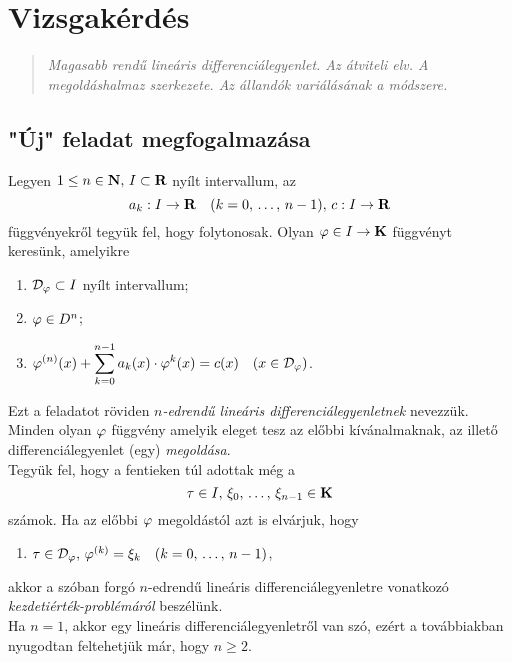 \newpage
\section{Vizsgakérdés}
\begin{quote}
	\textit{Magasabb rendű lineáris differenciálegyenlet. Az átviteli elv. A megoldáshalmaz szerkezete. Az állandók variálásának a módszere.}
\end{quote}

\subsection{"Új" feladat megfogalmazása}
Legyen $1 \leq n \in \mathbf{N}, \, I \subset \mathbf{R}$ nyílt intervallum, az
\[
	a_k : I \to \mathbf{R} \quad (k = 0, \, \dots, \, n-1), \, c: I \to \mathbf{R}
\]
függvényekről tegyük fel, hogy folytonosak. Olyan $\varphi \in I \to \mathbf{K}$ függvényt keresünk, amelyikre
\begin{enumerate}
	\item $\mathcal{D}_\varphi \subset I$ nyílt intervallum;
	\item $\varphi \in D^n$;
	\item $\displaystyle \varphi^{(n)}(x) + \sum_{k=0}^{n-1} a_k(x) \cdot \varphi^{k}(x) = c(x) \quad (x \in \mathcal{D}_\varphi)$.
\end{enumerate}
Ezt a feladatot röviden \textit{$n$-edrendű lineáris differenciálegyenletnek} nevezzük. Minden olyan $\varphi$ függvény amelyik eleget tesz az előbbi kívánalmaknak, az illető differenciálegyenlet (egy) \textit{megoldása}.\\

Tegyük fel, hogy a fentieken túl adottak még a
\[
	\tau \in I, \, \xi_0, \, \dots, \, \xi_{n-1} \in \mathbf{K}
\]
számok. Ha az előbbi $\varphi$ megoldástól azt is elvárjuk, hogy
\begin{enumerate}[start=4]
	\item $\tau \in \mathcal{D}_\varphi, \, \varphi^{(k)} = \xi_k \quad (k = 0, \, \dots, \, n-1)$,
\end{enumerate}
akkor a szóban forgó $n$-edrendű lineáris differenciálegyenletre vonatkozó \textit{kezdetiérték-problémáról} beszélünk.\\

Ha $n=1$, akkor egy lineáris differenciálegyenletről van szó, ezért a továbbiakban nyugodtan feltehetjük már, hogy $n \geq 2$.\\

